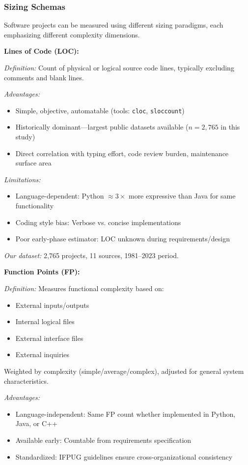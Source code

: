 \documentclass[11pt,a4paper]{article}
\begin{document}
\subsubsection{Sizing Schemas}
\label{sec:schemas}

Software projects can be measured using different sizing paradigms, each emphasizing different complexity dimensions.

\textbf{Lines of Code (LOC):}

\textit{Definition:} Count of physical or logical source code lines, typically excluding comments and blank lines.

\textit{Advantages:}
\begin{itemize}
    \item Simple, objective, automatable (tools: \texttt{cloc}, \texttt{sloccount})
    \item Historically dominant---largest public datasets available ($n = 2,765$ in this study)
    \item Direct correlation with typing effort, code review burden, maintenance surface area
\end{itemize}

\textit{Limitations:}
\begin{itemize}
    \item Language-dependent: Python $\approx 3\times$ more expressive than Java for same functionality
    \item Coding style bias: Verbose vs. concise implementations
    \item Poor early-phase estimator: LOC unknown during requirements/design
\end{itemize}

\textit{Our dataset:} 2,765 projects, 11 sources, 1981--2023 period.

\textbf{Function Points (FP):}

\textit{Definition:} Measures functional complexity based on:
\begin{itemize}
    \item External inputs/outputs
    \item Internal logical files
    \item External interface files
    \item External inquiries
\end{itemize}

Weighted by complexity (simple/average/complex), adjusted for general system characteristics.

\textit{Advantages:}
\begin{itemize}
    \item Language-independent: Same FP count whether implemented in Python, Java, or C++
    \item Available early: Countable from requirements specification
    \item Standardized: IFPUG guidelines ensure cross-organizational consistency
\end{itemize}
\end{document}
